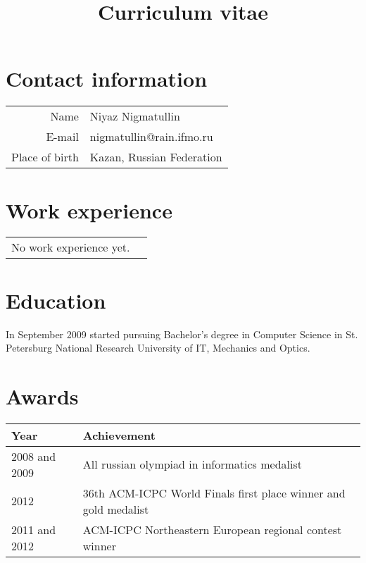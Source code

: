 \documentclass[11pt,a4paper,oneside]{article}
\begin{document}
\title{Curriculum vitae}
\date{}        
\maketitle

\section{Contact information}
\begin{center}
\begin{tabular}{r|l}
    Name&Niyaz Nigmatullin \\
    E-mail&nigmatullin@rain.ifmo.ru \\
    Place of birth&Kazan, Russian Federation \\
\end{tabular}
\end{center}

\section{Work experience}
\begin{center}
\begin{tabular}{rl}
    No work experience yet.    
\end{tabular}
\end{center}

\section{Education}
    In September 2009 started pursuing Bachelor's degree in Computer Science in St. Petersburg National Research University of IT, Mechanics and Optics.

\section{Awards}
\begin{center}
    \begin{tabular}{l|l}
        Year&Achievement \\
        \hline
        2008 and 2009& All russian olympiad in informatics medalist \\
        2012&36th ACM-ICPC World Finals first place winner and gold medalist \\
        2011 and 2012&ACM-ICPC Northeastern European regional contest winner \\
    \end{tabular}
\end{center}
\end{document}
